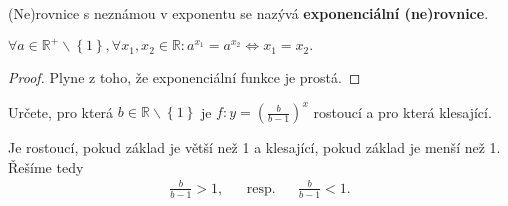 \begin{definition}
    (Ne)rovnice s neznámou v exponentu se nazývá \textbf{exponenciální (ne)rovnice}.
\end{definition}

\begin{veta}
    $\forall a \in \mathbb R^+ \smallsetminus \left \{ 1 \right \}, \forall x_1, x_2
    \in \mathbb R: a^{x_1}=a^{x_2}\iff x_1=x_2.$
\end{veta}

\begin{proof}
    Plyne z toho, že exponenciální funkce je prostá.
\end{proof}

\begin{priklad}
Určete, pro která $b\in \mathbb R\smallsetminus\left \{ 1 \right \} $ je $f:y=\left ( \frac{b}{b-1} \right )^x $
rostoucí a pro která klesající.
\end{priklad}

\begin{reseni}
Je rostoucí, pokud základ je větší než 1 a klesající, pokud základ je menší než 1.
Řešíme tedy
\begin{align*}
\frac{b}{b-1}>1, & & \textrm{resp.} & & \frac{b}{b-1}<1.
\end{align*}
\end{reseni}

